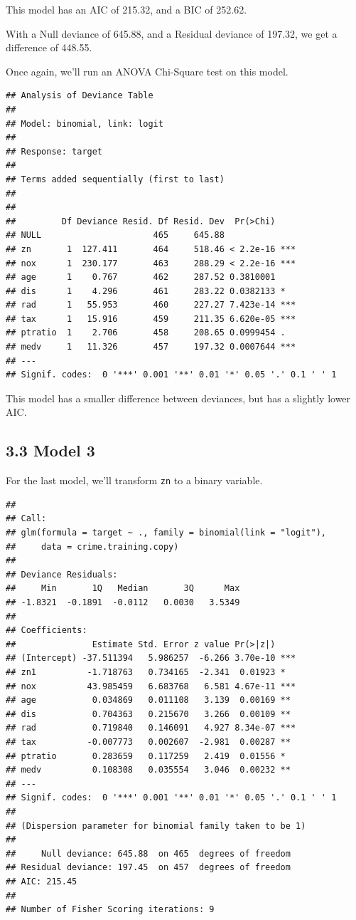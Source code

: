 \documentclass[]{article}
\begin{document}

This model has an AIC of 215.32, and a BIC of 252.62.

With a Null deviance of 645.88, and a Residual deviance of 197.32, we
get a difference of 448.55.

Once again, we'll run an ANOVA Chi-Square test on this model.

\begin{verbatim}
## Analysis of Deviance Table
## 
## Model: binomial, link: logit
## 
## Response: target
## 
## Terms added sequentially (first to last)
## 
## 
##         Df Deviance Resid. Df Resid. Dev  Pr(>Chi)    
## NULL                      465     645.88              
## zn       1  127.411       464     518.46 < 2.2e-16 ***
## nox      1  230.177       463     288.29 < 2.2e-16 ***
## age      1    0.767       462     287.52 0.3810001    
## dis      1    4.296       461     283.22 0.0382133 *  
## rad      1   55.953       460     227.27 7.423e-14 ***
## tax      1   15.916       459     211.35 6.620e-05 ***
## ptratio  1    2.706       458     208.65 0.0999454 .  
## medv     1   11.326       457     197.32 0.0007644 ***
## ---
## Signif. codes:  0 '***' 0.001 '**' 0.01 '*' 0.05 '.' 0.1 ' ' 1
\end{verbatim}

This model has a smaller difference between deviances, but has a
slightly lower AIC.

\subsection{3.3 Model 3}\label{model-3}

For the last model, we'll transform \texttt{zn} to a binary variable.

\begin{verbatim}
## 
## Call:
## glm(formula = target ~ ., family = binomial(link = "logit"), 
##     data = crime.training.copy)
## 
## Deviance Residuals: 
##     Min       1Q   Median       3Q      Max  
## -1.8321  -0.1891  -0.0112   0.0030   3.5349  
## 
## Coefficients:
##               Estimate Std. Error z value Pr(>|z|)    
## (Intercept) -37.511394   5.986257  -6.266 3.70e-10 ***
## zn1          -1.718763   0.734165  -2.341  0.01923 *  
## nox          43.985459   6.683768   6.581 4.67e-11 ***
## age           0.034869   0.011108   3.139  0.00169 ** 
## dis           0.704363   0.215670   3.266  0.00109 ** 
## rad           0.719840   0.146091   4.927 8.34e-07 ***
## tax          -0.007773   0.002607  -2.981  0.00287 ** 
## ptratio       0.283659   0.117259   2.419  0.01556 *  
## medv          0.108308   0.035554   3.046  0.00232 ** 
## ---
## Signif. codes:  0 '***' 0.001 '**' 0.01 '*' 0.05 '.' 0.1 ' ' 1
## 
## (Dispersion parameter for binomial family taken to be 1)
## 
##     Null deviance: 645.88  on 465  degrees of freedom
## Residual deviance: 197.45  on 457  degrees of freedom
## AIC: 215.45
## 
## Number of Fisher Scoring iterations: 9
\end{verbatim}
\end{document}

